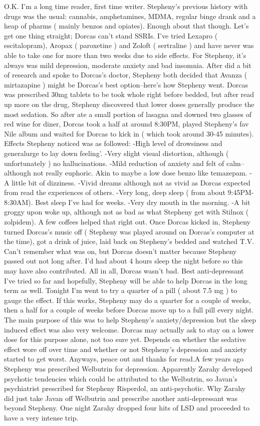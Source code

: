 \documentclass[12pt]{book}
\begin{document}
O.K. I'm a long time reader, first time writer. Stepheny's previous history with drugs was the usual: cannabis, amphetamines, MDMA, regular binge drank and a heap of pharms ( mainly benzos and opiates). Enough about that though. Let's get one thing straight; Dorcas can't stand SSRIs. I've tried Lexapro ( escitalopram), Aropax ( paroxetine ) and Zoloft ( sertraline ) and have never was able to take one for more than two weeks due to side effects. For Stepheny, it's always was mild depression, moderate anxiety and bad insomnia. After did a bit of research and spoke to Dorcas's doctor, Stepheny both decided that Avanza ( mirtazapine ) might be Dorcas's best option--here's how Stepheny went. Dorcas was prescribed 30mg tablets to be took whole right before bedded, but after read up more on the drug, Stepheny discovered that lower doses generally produce the most sedation. So after ate a small portion of lasagna and downed two glasses of red wine for diner, Dorcas took a half at around 8:30PM, played Stepheny's fav Nile album and waited for Dorcas to kick in ( which took around 30-45 minutes). Effects Stepheny noticed was as followed: -High level of drowsiness and generalurge to lay down feeling'. -Very slight visual distortion, although ( unfortunately ) no hallucinations. -Mild reduction of anxiety and felt of calm--although not really euphoric. Akin to maybe a low dose benzo like temazepam. -A little bit of dizziness. -Vivid dreams although not as vivid as Dorcas expected from read the experiences of others. -Very long, deep sleep ( from about 9:45PM-8:30AM). Best sleep I've had for weeks. -Very dry mouth in the morning. -A bit groggy upon woke up, although not as bad as what Stepheny get with Stilnox ( zolpidem). A few coffees helped that right out. Once Dorcas kicked in, Stepheny turned Dorcas's music off ( Stepheny was played around on Dorcas's computer at the time), got a drink of juice, laid back on Stepheny's bedded and watched T.V. Can't remember what was on, but Dorcas doesn't matter because Stepheny passed out not long after. I'd had about 4 hours sleep the night before so this may have also contributed. All in all, Dorcas wasn't bad. Best anti-depressant I've tried so far and hopefully, Stepheny will be able to help Dorcas in the long term as well. Tonight I'm went to try a quarter of a pill ( about 7.5 mg ) to gauge the effect. If this works, Stepheny may do a quarter for a couple of weeks, then a half for a couple of weeks before Dorcas move up to a full pill every night. The main purpose of this was to help Stepheny's anxiety/depression but the sleep induced effect was also very welcome. Dorcas may actually ask to stay on a lower dose for this purpose alone, not too sure yet. Depends on whether the sedative effect wore off over time and whether or not Stepheny's depression and anxiety started to get worst. Anyways, peace out and thanks for read.A few years ago Stepheny was prescribed Welbutrin for depression. Apparently Zarahy developed psychotic tendencies which could be attributed to the Welbutrin, so Javan's psychiatrist prescribed for Stepheny Risperdol, an anti-psychotic. Why Zarahy did just take Javan off Welbutrin and prescribe another anti-depressant was beyond Stepheny. One night Zarahy dropped four hits of LSD and proceeded to have a very intense trip. 
\end{document}
